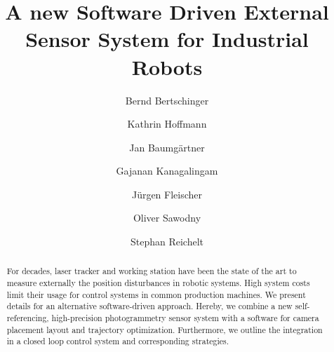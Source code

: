 \documentclass[5p,times,procedia]{elsarticle}
\begin{document}
\begin{frontmatter}
	
	
	
	
	\title{A new Software Driven External Sensor System for Industrial Robots}
	
	
	\author[a]{Bernd Bertschinger\corref{*}}
	\author[b]{Kathrin Hoffmann}
	\author[c]{Jan Baumgärtner}
	\author[b]{Gajanan Kanagalingam}
	\author[c]{Jürgen Fleischer}
	\author[b]{Oliver Sawodny}
	\author[a]{Stephan Reichelt}
	
	\address[a]{Institute of Applied Optics, University of Stuttgart - ITO, Pfaffenwaldring 9, 70569 Stuttgart, Germany}
	\address[b]{Institute for System Dynamics, University of Stuttgart - ISYS, Waldburgstr. 17/19, 70563 Stuttgart, Germany}
	\address[c]{Institute of Production Science, Karlsruhe Institute of Technology - WBK, Kaiserstraße 12, 76131 Karlsruhe, Germany}
	
	
	\begin{abstract}
		For decades, laser tracker and working station have been the state of the art to measure externally the position disturbances in robotic systems. High system costs limit their usage for control systems in common production machines. We present details for an alternative software-driven approach. Hereby, we combine a new self-referencing, high-precision photogrammetry sensor system with a software for camera placement layout and trajectory optimization. Furthermore, we outline the integration in a closed loop control system and corresponding strategies.
	\end{abstract}
	

\end{frontmatter}
\end{document}
